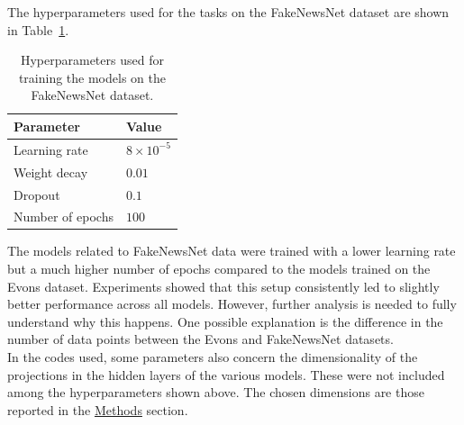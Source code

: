 \documentclass[a4paper,twoside,12pt]{book}
\begin{document}
The hyperparameters used for the tasks on the FakeNewsNet dataset are shown in Table~\ref{tab:fakenews-hparams}.

\begin{table}[H]
	
	\centering
	
	\begin{tabular}{ll}
		
		\toprule
		
		\textbf{Parameter} & \textbf{Value} \\
		
		\midrule
		
		Learning rate & $8 \times 10^{-5}$ \\
		
		Weight decay & $0.01$ \\
		
		Dropout & $0.1$ \\
		
		Number of epochs & $100$ \\
		
		\bottomrule
		
	\end{tabular}
	
	\caption{Hyperparameters used for training the models on the FakeNewsNet dataset.}
	
	\label{tab:fakenews-hparams}
	
\end{table}

The models related to FakeNewsNet data were trained with a lower learning rate but a much higher number of epochs compared to the models trained on the Evons dataset. Experiments showed that this setup consistently led to slightly better performance across all models. However, further analysis is needed to fully understand why this happens. One possible explanation is the difference in the number of data points between the Evons and FakeNewsNet datasets.\\
 In the codes used, some parameters also concern the dimensionality of the projections in the hidden layers of the various models. These were not included among the hyperparameters shown above. The chosen dimensions are those reported in the \hyperref[Methods]{Methods} section.

\printbibliography

\tableofcontents
\listoffigures
\end{document}
